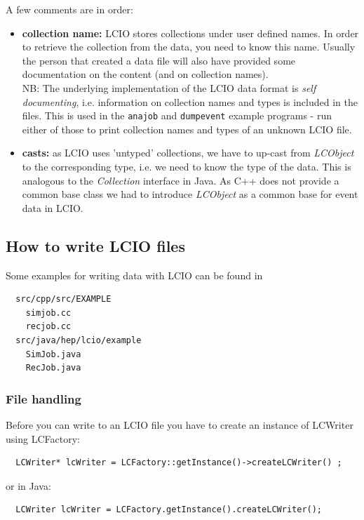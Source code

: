 \documentclass[twoside]{article}
\begin{document}
A few comments are in order:
\begin{itemize}
\item{ {\bf collection name:} LCIO stores collections under user defined names. In order to retrieve 
the collection from the data, you need to know this name. Usually the person that created a data 
file will also have provided some documentation on the content (and on collection names). \\
NB: The underlying implementation of the LCIO data format is {\em self documenting}, i.e. information
on collection names and types is included in the files. This is used in the \verb$anajob$ and 
\verb$dumpevent$ example programs - run either of those to print collection names and 
types of an unknown LCIO file.
}

\item{ {\bf casts:} as LCIO uses 'untyped' collections, we have to up-cast from {\em LCObject} to 
the corresponding type, i.e. we need to know the type of the data. This is analogous to the 
{\em Collection} interface in Java. As C++ does not provide a common base class we had to 
introduce {\em LCObject} as a common base for event data in LCIO.
}

\end {itemize}


\subsection{How to write LCIO files}

Some examples for writing data with LCIO can be found in
\begin{verbatim}
  src/cpp/src/EXAMPLE
    simjob.cc
    recjob.cc
  src/java/hep/lcio/example
    SimJob.java
    RecJob.java
\end{verbatim}

\subsubsection{File handling}
Before you can write to an LCIO file you have to create an instance of LCWriter using LCFactory:

\begin{verbatim}
  LCWriter* lcWriter = LCFactory::getInstance()->createLCWriter() ;
\end{verbatim}
or in Java:
\begin{verbatim}
  LCWriter lcWriter = LCFactory.getInstance().createLCWriter();
\end{verbatim}
\end{document}
